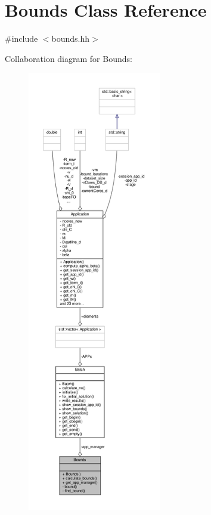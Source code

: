 \hypertarget{classBounds}{\section{Bounds Class Reference}
\label{classBounds}
}


{\ttfamily \#include $<$bounds.\-hh$>$}



Collaboration diagram for Bounds\-:
\nopagebreak
\begin{figure}[H]
\begin{center}
\leavevmode
\includegraphics[height=550pt]{classBounds__coll__graph}
\end{center}
\end{figure}
